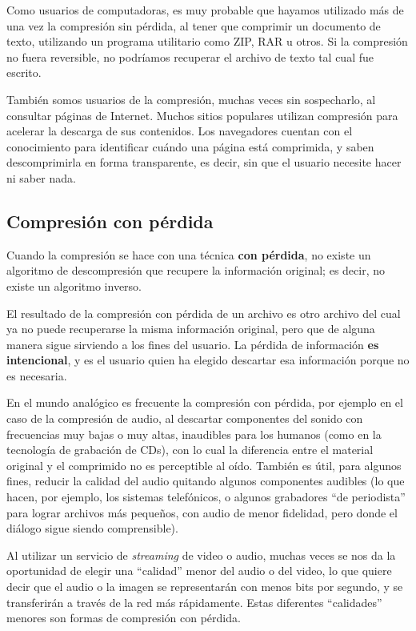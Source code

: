 \documentclass[spanish,A4,]{article}
\begin{document}
Como usuarios de computadoras, es muy probable que hayamos utilizado más
de una vez la compresión sin pérdida, al tener que comprimir un
documento de texto, utilizando un programa utilitario como ZIP, RAR u
otros. Si la compresión no fuera reversible, no podríamos recuperar el
archivo de texto tal cual fue escrito.

También somos usuarios de la compresión, muchas veces sin sospecharlo,
al consultar páginas de Internet. Muchos sitios populares utilizan
compresión para acelerar la descarga de sus contenidos. Los navegadores
cuentan con el conocimiento para identificar cuándo una página está
comprimida, y saben descomprimirla en forma transparente, es decir, sin
que el usuario necesite hacer ni saber nada.

\subsection{Compresión con pérdida}\label{compresiuxf3n-con-puxe9rdida}

Cuando la compresión se hace con una técnica \textbf{con pérdida}, no
existe un algoritmo de descompresión que recupere la información
original; es decir, no existe un algoritmo inverso.

El resultado de la compresión con pérdida de un archivo es otro archivo
del cual ya no puede recuperarse la misma información original, pero que
de alguna manera sigue sirviendo a los fines del usuario. La pérdida de
información \textbf{es intencional}, y es el usuario quien ha elegido
descartar esa información porque no es necesaria.

En el mundo analógico es frecuente la compresión con pérdida, por
ejemplo en el caso de la compresión de audio, al descartar componentes
del sonido con frecuencias muy bajas o muy altas, inaudibles para los
humanos (como en la tecnología de grabación de CDs), con lo cual la
diferencia entre el material original y el comprimido no es perceptible
al oído. También es útil, para algunos fines, reducir la calidad del
audio quitando algunos componentes audibles (lo que hacen, por ejemplo,
los sistemas telefónicos, o algunos grabadores ``de periodista'' para
lograr archivos más pequeños, con audio de menor fidelidad, pero donde
el diálogo sigue siendo comprensible).

Al utilizar un servicio de \emph{streaming} de video o audio, muchas
veces se nos da la oportunidad de elegir una ``calidad'' menor del audio
o del video, lo que quiere decir que el audio o la imagen se
representarán con menos bits por segundo, y se transferirán a través de
la red más rápidamente. Estas diferentes ``calidades'' menores son
formas de compresión con pérdida.
\end{document}
